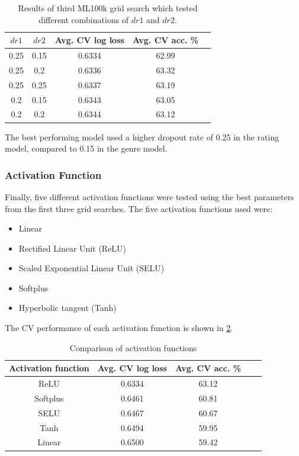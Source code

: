 \begin{table}[H]
\centering
\begin{tabular}{c | c | c | c | c}
\toprule
\textbf{$dr1$} & \textbf{$dr2$} & \textbf{Avg. CV log loss} & \textbf{Avg. CV acc.} \% \\
\midrule
0.25 & 0.15 & 0.6334 & 62.99 \\
\midrule
0.25 & 0.2 & 0.6336 & 63.32 \\
\midrule
0.25 & 0.25 & 0.6337 & 63.19 \\
\midrule
0.2 & 0.15 & 0.6343 & 63.05 \\
\midrule
0.2 & 0.2 & 0.6344 & 63.12 \\
\bottomrule
\end{tabular}
\caption[MovieLens 100k grid search results -- dropout rates]{Results of third ML100k grid search which tested different combinations of $dr1$ and $dr2$.}
\label{tab:ml100k-grid-results3}
\end{table}

The best performing model used a higher dropout rate of 0.25 in the rating model, compared to 0.15 in the genre model.

\subsubsection{Activation Function}
Finally, five different activation functions were tested using the best parameters from the first three grid searches. The five activation functions used were:
\begin{itemize}
    \item Linear
    \item Rectified Linear Unit (ReLU)
    \item Scaled Exponential Linear Unit (SELU)
    \item Softplus
    \item Hyperbolic tangent (Tanh)
\end{itemize}
The CV performance of each activation function is shown in \ref{tab:ml100k-activations}.

\begin{table}[H]
\centering
\begin{tabular}{c | c | c | c | c}
\toprule
\textbf{Activation function} & \textbf{Avg. CV log loss} & \textbf{Avg. CV acc.} \% \\
\midrule
ReLU & 0.6334 & 63.12 \\
\midrule
Softplus & 0.6461 & 60.81 \\
\midrule
SELU & 0.6467 & 60.67 \\
\midrule
Tanh & 0.6494 & 59.95 \\
\midrule
Linear & 0.6500 & 59.42 \\
\bottomrule
\end{tabular}
\caption[MovieLens 100k grid search results -- activation function]{Comparison of activation functions}
\label{tab:ml100k-activations}
\end{table}

